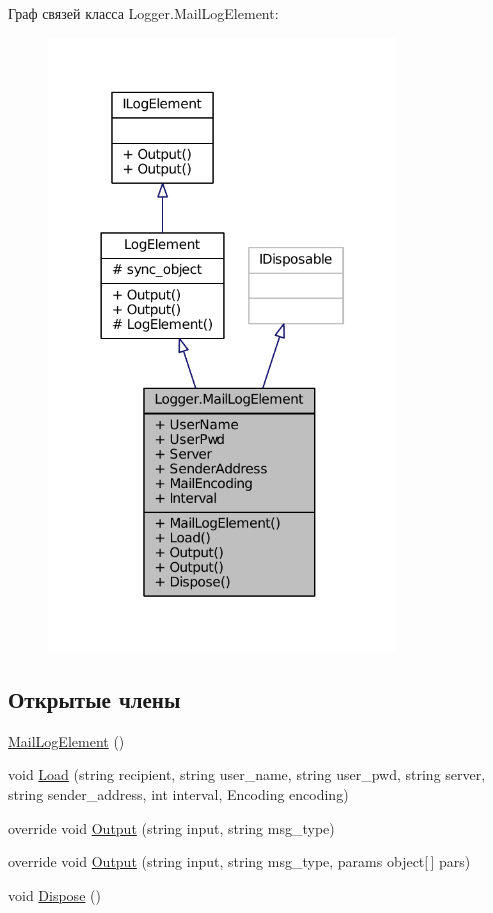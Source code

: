 Граф связей класса Logger.\+Mail\+Log\+Element\+:
\nopagebreak
\begin{figure}[H]
\begin{center}
\leavevmode
\includegraphics[width=261pt]{class_logger_1_1_mail_log_element__coll__graph}
\end{center}
\end{figure}
\subsection*{Открытые члены}
\begin{DoxyCompactItemize}
\item 
\hyperlink{class_logger_1_1_mail_log_element_a5ea3bef606bb2d0d180b8f474b903607}{Mail\+Log\+Element} ()
\item 
void \hyperlink{class_logger_1_1_mail_log_element_aca886e0feadfc51145cc9863fca7292c}{Load} (string recipient, string user\+\_\+name, string user\+\_\+pwd, string server, string sender\+\_\+address, int interval, Encoding encoding)
\item 
override void \hyperlink{class_logger_1_1_mail_log_element_aeeef631086c557ae8178d94a34371792}{Output} (string input, string msg\+\_\+type)
\item 
override void \hyperlink{class_logger_1_1_mail_log_element_a97a0e43476c50853747f8d7b00cab465}{Output} (string input, string msg\+\_\+type, params object\mbox{[}$\,$\mbox{]} pars)
\item 
void \hyperlink{class_logger_1_1_mail_log_element_a2bb8d4b7e60c6733783ff3fcf2c0e6b0}{Dispose} ()
\end{DoxyCompactItemize}
